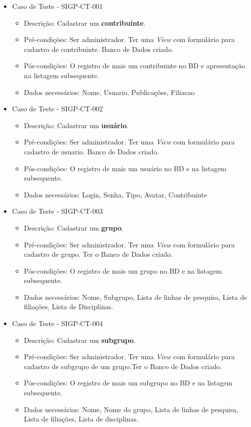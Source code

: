 \documentclass[11pt, a4paper]{book}
\begin{document}
\begin{itemize}
	\item Caso de Teste - SIGP-CT-001
	\begin{itemize}
	\item Descrição: Cadastrar um \textbf{contribuinte}.
	\item Pré-condições: Ser administrador. Ter uma \emph{View} com formulário para cadastro de contribuinte. Banco de Dados criado.
	\item Pós-condições: O registro de mais um contribuinte no BD e apresentação na listagem subsequente.
	\item Dados necessários: Nome, Usuario, Publicações, Filiacao
	\end{itemize}

	\item  Caso de Teste - SIGP-CT-002 
	\begin{itemize}
	\item Descrição: Cadastrar um \textbf{usuário}.
	\item Pré-condições: Ser administrador. Ter uma \emph{View} com formulário para cadastro de usuario. Banco de Dados criado.
	\item Pós-condições: O registro de mais um usuário no BD e na listagem subsequente.
	\item Dados necessários: Login, Senha, Tipo, Avatar, Contribuinte
	\end{itemize}
	
	\item Caso de Teste - SIGP-CT-003
	\begin{itemize}
	\item Descrição: Cadastrar um \textbf{grupo}.
	\item Pré-condições: Ser administrador. Ter uma \emph{View} com formulário para cadastro de grupo. Ter o Banco de Dados criado.
	\item Pós-condições: O registro de mais um grupo no BD e na listagem subsequente.
	\item Dados necessários: Nome, Subgrupo, Lista de linhas de pesquisa, Lista de filiações, Lista de Disciplinas.
	\end{itemize}

\newpage

	\item Caso de Teste - SIGP-CT-004
	\begin{itemize}
	\item Descrição: Cadastrar um \textbf{subgrupo}.
	\item Pré-condições: Ser administrador. Ter uma \emph{View} com formulário para cadastro de subgrupo de um grupo.Ter o Banco de Dados criado.
	\item Pós-condições: O registro de mais um subgrupo no BD e na listagem subsequente.
	\item Dados necessários: Nome, Nome do grupo, Lista de linhas de pesquisa, Lista de filiações, Lista de disciplinas.
	\end{itemize}


\end{itemize}
\end{document}
